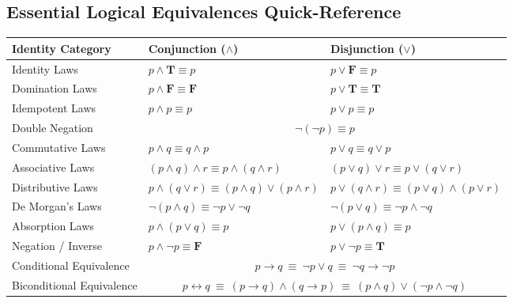 \documentclass[11pt,a4paper]{article}
\begin{document}
\subsection{Essential Logical Equivalences Quick-Reference}
\begin{center}
\renewcommand{\arraystretch}{1.2}
\small
\begin{tabularx}{\linewidth}{|l|X|X|}
\hline
\rowcolor{navy!15} \textbf{Identity Category} & \textbf{Conjunction ($\wedge$)} & \textbf{Disjunction ($\vee$)} \\
\hline
Identity Laws & $p \wedge \mathbf{T} \equiv p$ & $p \vee \mathbf{F} \equiv p$ \\
Domination Laws & $p \wedge \mathbf{F} \equiv \mathbf{F}$ & $p \vee \mathbf{T} \equiv \mathbf{T}$ \\
Idempotent Laws & $p \wedge p \equiv p$ & $p \vee p \equiv p$ \\
Double Negation & \multicolumn{2}{c|}{$\neg(\neg p) \equiv p$} \\
Commutative Laws & $p \wedge q \equiv q \wedge p$ & $p \vee q \equiv q \vee p$ \\
Associative Laws & $(p \wedge q) \wedge r \equiv p \wedge (q \wedge r)$ & $(p \vee q) \vee r \equiv p \vee (q \vee r)$ \\
Distributive Laws & $p \wedge (q \vee r) \equiv (p \wedge q) \vee (p \wedge r)$ & $p \vee (q \wedge r) \equiv (p \vee q) \wedge (p \vee r)$ \\
De Morgan's Laws & $\neg(p \wedge q) \equiv \neg p \vee \neg q$ & $\neg(p \vee q) \equiv \neg p \wedge \neg q$ \\
Absorption Laws & $p \wedge (p \vee q) \equiv p$ & $p \vee (p \wedge q) \equiv p$ \\
Negation / Inverse & $p \wedge \neg p \equiv \mathbf{F}$ & $p \vee \neg p \equiv \mathbf{T}$ \\
Conditional Equivalence & \multicolumn{2}{c|}{$p \rightarrow q \ \equiv \ \neg p \vee q \ \equiv \ \neg q \rightarrow \neg p$} \\
Biconditional Equivalence & \multicolumn{2}{c|}{$p \leftrightarrow q \ \equiv \ (p \rightarrow q) \wedge (q \rightarrow p) \ \equiv \ (p \wedge q) \vee (\neg p \wedge \neg q)$} \\
\hline
\end{tabularx}
\end{center}
\end{document}
